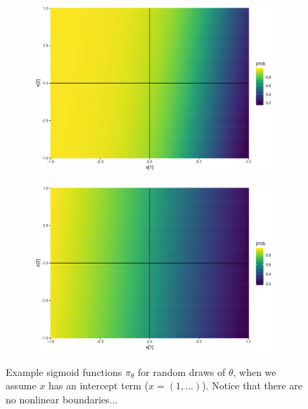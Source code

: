 \documentclass[10pt,mathserif]{beamer}
\begin{document}
\begin{frame}
\begin{figure}
\begin{subfigure}{.17\paperwidth}
    \end{subfigure}
    \begin{subfigure}{.17\paperwidth}
      \centering
      \includegraphics[width=0.17\paperwidth]{figure/sigmoid_plot_9}
    \end{subfigure}
    \begin{subfigure}{.17\paperwidth}
      \centering
      \includegraphics[width=0.17\paperwidth]{figure/sigmoid_plot_10}
    \end{subfigure}
    \caption{Example sigmoid functions $\pi_{\theta}$ for random draws of
      $\theta$, when we assume $x$ has an intercept term ($x = \left(1,
      \dots\right)$). Notice that there are no nonlinear boundaries...
      \label{fig:logistic_scatter_nonlinear} }
  \end{figure}
\end{frame}
\end{document}
